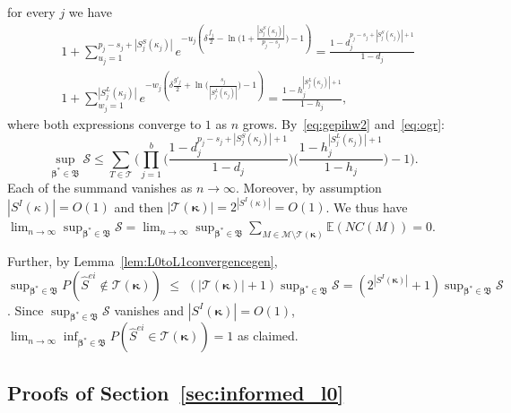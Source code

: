 \documentclass[
  12pt]{article}
\newcommand{\E}{\mathbb{E}}
\newcommand{\M}{\mathcal{M}}
\newcommand{\T}{\mathcal{T}}
\newcommand{\bbeta}{\boldsymbol{\beta}}
\newcommand{\bB}{\mathfrak{B}}
\newcommand{\bkappa}{\boldsymbol{\kappa}}
\begin{document}
 for every $j$ we have
\begin{eqnarray*}
    &1+\sum_{u_j=1}^{p_j-s_j+|S_j^{S}(\kappa_j)|}e^{-u_j\left(\delta \tfrac{f_j}{2}-\ln\big(1+\frac{|S_j^{S}(\kappa_j)|}{p_j-s_j}\big)-1\right)}
    =\frac{1-d_j^{p_j-s_j+|S_j^{S}(\kappa_j)|+1}}{1-d_j} \\
    &1+\sum_{w_j=1}^{|S_j^{L}(\kappa_j)|}    e^{-w_j\left(\delta \tfrac{g'_j}{2}+\ln\big(\frac{s_j}{|S_j^{L}(\kappa_j)|}\big)-1\right)} =\frac{1-h_j^{|S_j^{L}(\kappa_j)|+1}}{1-h_j},
\end{eqnarray*}
where both expressions converge to $1$ as $n$ grows. By~\eqref{eq:gepihw2} and~\eqref{eq:ogr}:
$$\sup_{\bbeta^*\in\bB}\mathcal{S}\leq\sum_{T\in\T}\Bigg(\prod_{j=1}^b\Big(\frac{1-d_j^{p_j-s_j+|S_j^{S}(\kappa_j)|+1}}{1-d_j}\Big)\Big(\frac{1-h_j^{|S_j^{L}(\kappa_j)|+1}}{1-h_j}\Big)-1\Bigg).$$
Each of the summand vanishes as $n\to\infty$. Moreover, by assumption $|S^I(\kappa)|=O(1)$ and then $|\T(\bkappa)|=2^{|S^I(\kappa)|}=O(1)$. We thus have $\lim_{n\to\infty}\sup_{\bbeta^*\in\bB}\mathcal{S}=\lim_{n\to\infty}\sup_{\bbeta^*\in\bB}\sum_{M \in \M\setminus \T(\bkappa)} \E\left(NC(M)\right)=0$.

Further, by Lemma~\ref{lem:L0toL1convergencegen}, 
$\sup_{\bbeta^*\in\bB}P(\hat{S}^{ei} \not\in \T(\bkappa) ) \,\,\leq \,\, (|\T(\bkappa)|+1) \sup_{\bbeta^*\in\bB}\mathcal{S} = (2^{|S^{I}(\bkappa)|}+1) \sup_{\bbeta^*\in\bB}\mathcal{S}$. Since $\sup_{\bbeta^*\in\bB}\mathcal{S}$ vanishes and $|S^{I}(\bkappa)|=O(1)$, $\lim_{n\to\infty}\inf_{\bbeta^*\in\bB}P(\hat{S}^{ei} \in \T(\bkappa) )=1$ as claimed.

 
\subsection{Proofs of Section~\ref{sec:informed_l0}}\label{suppsec:proofsempbayes}
\end{document}
